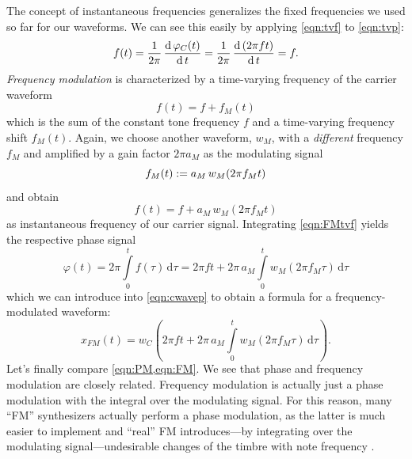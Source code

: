 \documentclass[a4paper]{article}
\def\d{\mathrm{d}}
\newcommand{\TODO}[1]{%
  \fboxsep=1pt\fboxrule=1pt\fcolorbox{yellow}{white}{[\textbf{TODO:~}#1]}%
}
\begin{document}
The concept of instantaneous frequencies generalizes the fixed frequencies we
used so far for our waveforms. We can see this easily by applying \cref{eqn:tvf} 
to \cref{eqn:tvp}:
\begin{equation}
  \notag
  f(t)
  = \frac{1}{2\pi}\,\frac{\d\,\varphi_C(t)}{\d\,t}
  = \frac{1}{2\pi}\,\frac{\d\left(2\pi ft\right)}{\d\,t}
  = f.
\end{equation}
\emph{Frequency modulation} is characterized by a time-varying frequency of the
carrier waveform
\begin{equation}
  \label{eqn:instfreq}
  f(t) = f+f_M(t)
\end{equation}
which is the sum of the constant tone frequency $f$ and a time-varying frequency
shift $f_M(t)$. Again, we choose another waveform, $w_M$, with a
\emph{different} frequency $f_M$ and amplified by a gain factor $2\pi a_M$ as
the modulating signal
\begin{equation}
  \notag
  f_M(t):=a_M\,w_M(2\pi f_M t)
\end{equation}
and obtain
\begin{equation}
  \label{eqn:FMtvf}
  f(t) = f + a_M\,w_M(2\pi f_M t)
\end{equation}
as instantaneous frequency of our carrier signal. Integrating \cref{eqn:FMtvf}
yields the respective phase signal
\begin{equation}
  \varphi(t) 
  = 2\pi \int\limits_0^t f(\tau)\,\d\tau
  = 2\pi f t + 2\pi\, a_M \int\limits_0^t w_M(2\pi f_M \tau)\,\d\tau
\end{equation} 
which we can introduce into \cref{eqn:cwavep} to obtain a formula for a
frequency-modulated waveform:
\begin{equation}
  \label{eqn:FM}
  x_{FM}(t) = w_C\!\!\left(2\pi f t + 2\pi\, a_M \int\limits_0^t w_M(2\pi f_M \tau)\,\d\tau\right)\!\!.
\end{equation}
%
Let's finally compare \cref{eqn:PM,eqn:FM}. We see that phase and frequency
modulation are closely related. Frequency modulation is actually just a phase
modulation with the integral over the modulating signal. For this reason, many
``FM'' synthesizers actually perform a phase modulation, as the latter is much
easier to implement and ``real'' FM introduces---by integrating over the
modulating signal---undesirable changes of the timbre with note frequency
\TODO{\cite{}}.
\end{document}
